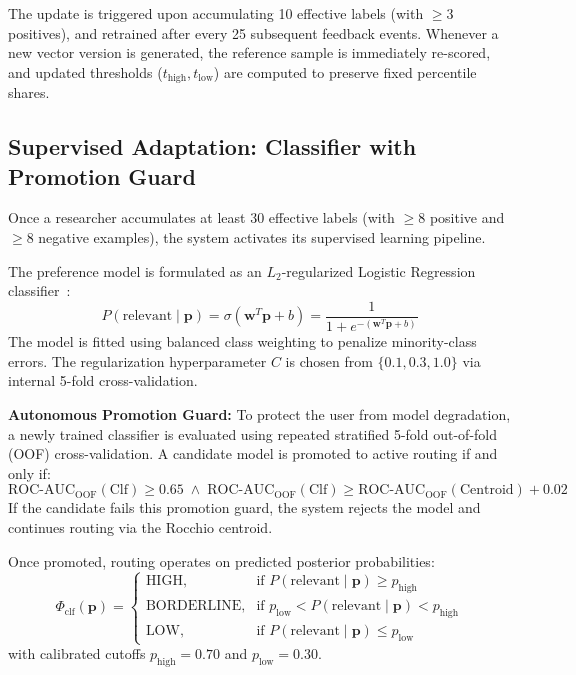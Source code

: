 The update is triggered upon accumulating 10 effective labels (with $\ge 3$ positives), and retrained after every 25 subsequent feedback events. Whenever a new vector version is generated, the reference sample is immediately re-scored, and updated thresholds ($t_{\text{high}}, t_{\text{low}}$) are computed to preserve fixed percentile shares.

\subsection{Supervised Adaptation: Classifier with Promotion Guard}
\label{sec:supervised_classifier}

Once a researcher accumulates at least 30 effective labels (with $\ge 8$ positive and $\ge 8$ negative examples), the system activates its supervised learning pipeline.

The preference model is formulated as an $L_2$-regularized Logistic Regression classifier~\cite{pedregosa2011scikit}:
\begin{equation}
P(\text{relevant} \mid \mathbf{p}) = \sigma(\mathbf{w}^T \mathbf{p} + b) = \frac{1}{1 + e^{-(\mathbf{w}^T \mathbf{p} + b)}}
\end{equation}
The model is fitted using balanced class weighting to penalize minority-class errors. The regularization hyperparameter $C$ is chosen from $\{0.1, 0.3, 1.0\}$ via internal 5-fold cross-validation.

\noindent\textbf{Autonomous Promotion Guard:} To protect the user from model degradation, a newly trained classifier is evaluated using repeated stratified 5-fold out-of-fold (OOF) cross-validation. A candidate model is promoted to active routing if and only if:
\begin{equation}
\text{ROC-AUC}_{\text{OOF}}(\text{Clf}) \ge 0.65 \;\land\; \text{ROC-AUC}_{\text{OOF}}(\text{Clf}) \ge \text{ROC-AUC}_{\text{OOF}}(\text{Centroid}) + 0.02
\end{equation}
If the candidate fails this promotion guard, the system rejects the model and continues routing via the Rocchio centroid.

Once promoted, routing operates on predicted posterior probabilities:
\begin{equation}
\Phi_{\text{clf}}(\mathbf{p}) = \begin{cases}
\text{HIGH}, & \text{if } P(\text{relevant} \mid \mathbf{p}) \ge p_{\text{high}} \\
\text{BORDERLINE}, & \text{if } p_{\text{low}} < P(\text{relevant} \mid \mathbf{p}) < p_{\text{high}} \\
\text{LOW}, & \text{if } P(\text{relevant} \mid \mathbf{p}) \le p_{\text{low}}
\end{cases}
\end{equation}
with calibrated cutoffs $p_{\text{high}} = 0.70$ and $p_{\text{low}} = 0.30$.
